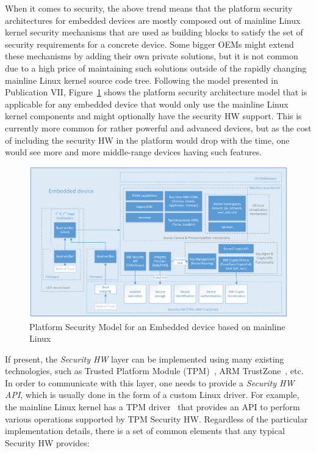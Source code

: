 When it comes to security, the above trend means that the platform security architectures for embedded devices are mostly composed out of mainline Linux kernel security mechanisms that are used as building blocks to satisfy the set of security requirements for a concrete device. Some bigger OEMs might extend these mechanisms by adding their own private solutions, but it is not common due to a high price of maintaining such solutions outside of the rapidly changing mainline Linux kernel source code tree. Following the model presented in Publication VII, Figure~\ref{fig:platsec} shows the platform security architecture model that is applicable for any embedded device that would only use the mainline Linux kernel components and might optionally have the security HW support. This is currently more common for rather powerful and advanced devices, but as the cost of including the security HW in the platform would drop with the time, one would see more and more middle-range devices having such features. 


\begin{figure}[t]
	\centering
		\includegraphics[width=1\textwidth]{figures/LinuxKernelPlatSecModel.png}
	\caption{Platform Security Model for an Embedded device based on mainline Linux}
	\label{fig:platsec}
\end{figure}

If present, the \textit{Security HW} layer can be implemented using many existing technologies, such as Trusted Platform Module (TPM)~\cite{tpm}, ARM TrustZone~\cite{trustzone}, etc. In order to communicate with this layer, one needs to provide a \textit{Security HW API}, which is usually done in the form of a custom Linux driver. For example, the mainline Linux kernel has a TPM driver~\cite{tpmdriver} that provides an API to perform various operations supported by TPM Security HW. Regardless of the particular implementation details, there is a set of common elements that any typical Security HW provides:

